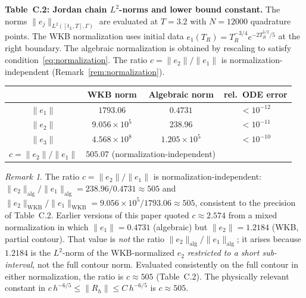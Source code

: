 \documentclass[12pt,a4paper]{amsart}
\theoremstyle{remark}
\newtheorem{remark}[theorem]{Remark}
\begin{document}
\medskip
\noindent\textbf{Table~C.2: Jordan chain $L^2$-norms and lower bound constant.}
The norms $\|e_j\|_{L^2([t_L,T],\Gamma)}$ are evaluated at $T=3.2$ with $N=12000$
quadrature points.  The WKB normalization uses initial data
$e_1(T_R) = T_R^{-3/4}e^{-2T_R^{5/2}/5}$ at the right boundary.
The algebraic normalization is obtained by rescaling to satisfy
condition~\eqref{eq:normalization}.
The ratio $c = \|e_2\|/\|e_1\|$ is normalization-independent
(Remark~\ref{rem:normalization}).
\begin{center}
\begin{tabular}{cccc}
\hline
 & WKB norm & Algebraic norm & rel.\ ODE error \\
\hline
$\|e_1\|$ & $1793.06$ & $0.4731$ & $< 10^{-12}$ \\
$\|e_2\|$ & $9.056\times10^5$ & $238.96$ & $< 10^{-11}$ \\
$\|e_3\|$ & $4.568\times10^8$ & $1.205\times10^5$ & $< 10^{-10}$ \\
\hline
$c = \|e_2\|/\|e_1\|$ & \multicolumn{2}{c}{$505.07$ (normalization-independent)} & \\
\hline
\end{tabular}
\end{center}
\medskip
\begin{remark}
The ratio $c = \|e_2\|/\|e_1\|$ is normalization-independent:
$\|e_2\|_{\mathrm{alg}}/\|e_1\|_{\mathrm{alg}} = 238.96/0.4731 \approx 505$
and $\|e_2\|_{\mathrm{WKB}}/\|e_1\|_{\mathrm{WKB}} = 9.056\times10^5/1793.06 \approx 505$,
consistent to the precision of Table~C.2.
Earlier versions of this paper quoted $c \approx 2.574$ from a mixed
normalization in which $\|e_1\| = 0.4731$ (algebraic) but $\|e_2\| = 1.2184$
(WKB, partial contour). That value is \emph{not} the ratio
$\|e_2\|_{\mathrm{alg}}/\|e_1\|_{\mathrm{alg}}$; it arises because $1.2184$
is the $L^2$-norm of the WKB-normalized $e_2$ \emph{restricted to a short
sub-interval}, not the full contour norm. Evaluated consistently on the full
contour in either normalization, the ratio is $c \approx 505$ (Table~C.2).
The physically relevant constant in
$c\,h^{-6/5} \leq \|R_h\| \leq C\,h^{-6/5}$ is $c \approx 505$.
\end{remark}
\end{document}
